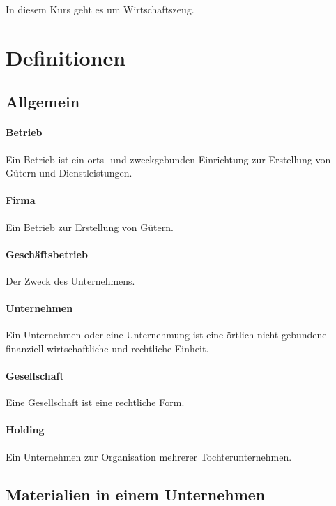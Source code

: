 \documentclass[../main.tex]{subfiles}
\begin{document}
    In diesem Kurs geht es um Wirtschaftszeug.
    \clearpage

    \section{Definitionen}
        \subsection{Allgemein}
            \paragraph{Betrieb}
                Ein Betrieb ist ein orts- und zweckgebunden Einrichtung zur Erstellung von Gütern und Dienstleistungen.
                
            \paragraph{Firma}
                Ein Betrieb zur Erstellung von Gütern.
                
            \paragraph{Geschäftsbetrieb}
                Der Zweck des Unternehmens.
                
            \paragraph{Unternehmen}
                Ein Unternehmen oder eine Unternehmung ist eine örtlich nicht gebundene finanziell-wirtschaftliche und rechtliche Einheit.
                
            \paragraph{Gesellschaft}
                Eine Gesellschaft ist eine rechtliche Form.
            
            \paragraph{Holding}
                Ein Unternehmen zur Organisation mehrerer Tochterunternehmen.

        \subsection{Materialien in einem Unternehmen}
\end{document}
